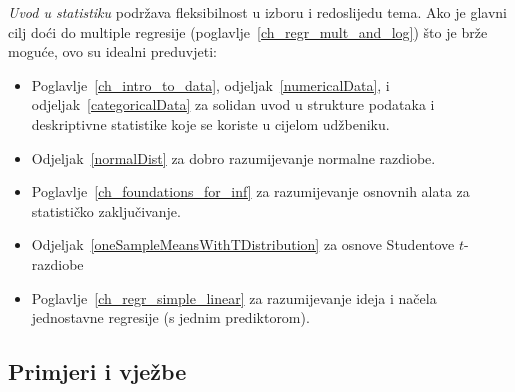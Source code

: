 \noindent%
\emph{Uvod u statistiku} podržava fleksibilnost 
u izboru i redoslijedu tema.
Ako je glavni cilj doći do multiple regresije
(poglavlje~\ref{ch_regr_mult_and_log})
što je brže moguće, ovo su idealni preduvjeti:
\begin{itemize}
\setlength{\itemsep}{0mm}
\item Poglavlje~\ref{ch_intro_to_data},
    odjeljak~\ref{numericalData},
    i odjeljak~\ref{categoricalData} za solidan
    uvod u strukture podataka i deskriptivne statistike
    koje se koriste u cijelom udžbeniku.
\item Odjeljak~\ref{normalDist}
    za dobro razumijevanje normalne razdiobe.
\item Poglavlje~\ref{ch_foundations_for_inf}
    za razumijevanje osnovnih alata za statističko zaključivanje.
%    
%    
\item Odjeljak~\ref{oneSampleMeansWithTDistribution}
    za osnove Studentove $t$-razdiobe
\item Poglavlje~\ref{ch_regr_simple_linear}
    za razumijevanje ideja i načela jednostavne regresije
    (s jednim prediktorom).
\end{itemize}


\subsection*{{\color{oiB}Primjeri i vježbe}}

